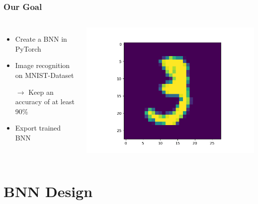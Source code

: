 \documentclass[aspectratio=1610, 12pt]{beamer}
\begin{document}
\begin{frame}
\frametitle{Our Goal}
\begin{columns}
	\begin{itemize}
		\item Create a BNN in PyTorch
		\item Image recognition on MNIST-Dataset
		\item[$\rightarrow$] Keep an accuracy of at least 90\%
		\item Export trained BNN
	\end{itemize}
	\centering
	\includegraphics[scale=.5]{./images/comparison/default_3}
\end{columns}
\end{frame}



\section{BNN Design}
\begin{frame}
\tableofcontents[currentsection]
\end{frame}
\end{document}
